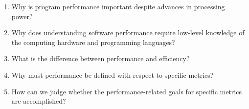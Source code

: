 \begin{enumerate}
\item Why is program performance important despite advances in processing power?
\item Why does understanding software performance require low-level knowledge of the computing hardware and programming languages?
\item What is the difference between performance and efficiency?
\item Why must performance be defined with respect to specific metrics?
\item How can we judge whether the performance-related goals for specific metrics are accomplished?
\end{enumerate}